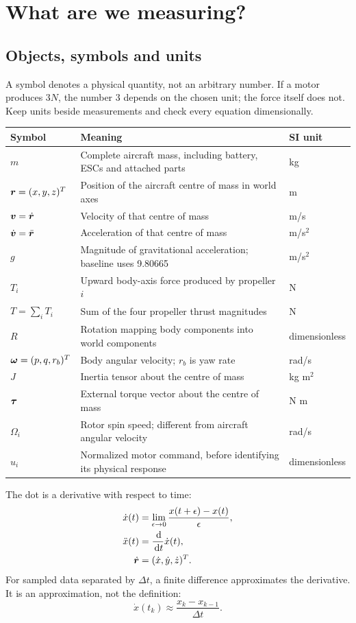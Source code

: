 \chapter{What are we measuring?}
\section{Objects, symbols and units}
A symbol denotes a physical quantity, not an arbitrary number. If a motor
produces $3\unit{N}$, the number 3 depends on the chosen unit; the force itself
does not. Keep units beside measurements and check every equation dimensionally.

\begin{longtable}{@{}p{.17\linewidth}p{.53\linewidth}p{.22\linewidth}@{}}
\toprule Symbol & Meaning & SI unit\\\midrule\endhead
$m$ & Complete aircraft mass, including battery, ESCs and attached parts & kg\\
$\bm{r}=(x,y,z)^T$ & Position of the aircraft centre of mass in world axes & m\\
$\bm{v}=\dot{\bm{r}}$ & Velocity of that centre of mass & m/s\\
$\dot{\bm{v}}=\ddot{\bm{r}}$ & Acceleration of that centre of mass & m/s$^2$\\
$g$ & Magnitude of gravitational acceleration; baseline uses 9.80665 & m/s$^2$\\
$T_i$ & Upward body-axis force produced by propeller $i$ & N\\
$T=\sum_iT_i$ & Sum of the four propeller thrust magnitudes & N\\
$R$ & Rotation mapping body components into world components & dimensionless\\
$\bm{\omega}=(p,q,r_b)^T$ & Body angular velocity; $r_b$ is yaw rate & rad/s\\
$J$ & Inertia tensor about the centre of mass & kg m$^2$\\
$\bm{\tau}$ & External torque vector about the centre of mass & N m\\
$\Omega_i$ & Rotor spin speed; different from aircraft angular velocity & rad/s\\
$u_i$ & Normalized motor command, before identifying its physical response & dimensionless\\
\bottomrule
\end{longtable}

The dot is a derivative with respect to time:
\begin{align}
\dot x(t)&=\lim_{\epsilon\to0}\frac{x(t+\epsilon)-x(t)}{\epsilon},\\
\ddot x(t)&=\frac{\,\mathrm d}{\,\mathrm d t}\dot x(t),\\
\dot{\bm{r}}&=(\dot x,\dot y,\dot z)^T.
\end{align}
For sampled data separated by $\Delta t$, a finite difference approximates the
derivative. It is an approximation, not the definition:
\begin{equation}
\dot x(t_k)\approx\frac{x_k-x_{k-1}}{\Delta t}.
\end{equation}

